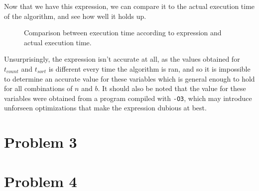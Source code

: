 \documentclass{article}
\begin{document}
Now that we have this expression, we can compare it to the actual execution time of the algorithm, and see how well it holds up. 


\testdata
\begin{figure}[H]
    \begin{center}
    \end{center}
    \caption{Comparison between execution time according to expression and actual execution time.}
\end{figure}

Unsurprisingly, the expression isn't accurate at all, as the values obtained for \( t_{count} \) and \( t_{sort} \) is different every time the algorithm is ran, and so it is impossible to determine an accurate value for these variables which is general enough to hold for all combinations of \( n \) and \( b \). It should also be noted that the value for these variables were obtained from a program compiled with \texttt{-O3}, which may introduce unforseen optimizations that make the expression dubious at best.


\section*{Problem 3}

\section*{Problem 4}
\end{document}
